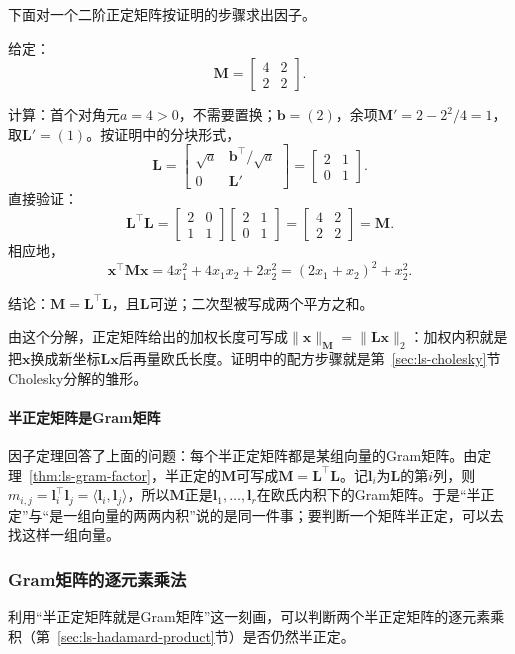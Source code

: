下面对一个二阶正定矩阵按证明的步骤求出因子。
\begin{example}[二阶正定矩阵的配方因子]
\label{ex:ls-gram-factor-two-by-two}
给定：
\[
 \bm M=\begin{bmatrix}4&2\\2&2\end{bmatrix}.
\]

计算：首个对角元$a=4>0$，不需要置换；$\bm b=(2)$，余项$\bm M'=2-2^2/4=1$，取$\bm L'=(1)$。按证明中的分块形式，
\[
 \bm L=\begin{bmatrix}\sqrt a&\bm b^\top/\sqrt a\\ 0&\bm L'\end{bmatrix}=\begin{bmatrix}2&1\\0&1\end{bmatrix}.
\]
直接验证：
\[
 \bm L^\top\bm L=\begin{bmatrix}2&0\\1&1\end{bmatrix}\begin{bmatrix}2&1\\0&1\end{bmatrix}=\begin{bmatrix}4&2\\2&2\end{bmatrix}=\bm M.
\]
相应地，
\[
 \bm x^\top\bm M\bm x=4x_1^2+4x_1x_2+2x_2^2=(2x_1+x_2)^2+x_2^2 .
\]

结论：$\bm M=\bm L^\top\bm L$，且$\bm L$可逆；二次型被写成两个平方之和。
\end{example}
由这个分解，正定矩阵给出的加权长度可写成$\lVert\bm x\rVert_{\bm M}=\lVert\bm L\bm x\rVert_2$：加权内积就是把$\bm x$换成新坐标$\bm L\bm x$后再量欧氏长度。证明中的配方步骤就是第~\ref{sec:ls-cholesky}节Cholesky分解的雏形。

\paragraph{半正定矩阵是Gram矩阵}
因子定理回答了上面的问题：每个半正定矩阵都是某组向量的Gram矩阵。由定理~\ref{thm:ls-gram-factor}，半正定的$\bm M$可写成$\bm M=\bm L^\top\bm L$。记$\bm l_i$为$\bm L$的第$i$列，则$m_{i,j}=\bm l_i^\top\bm l_j=\langle\bm l_i,\bm l_j\rangle$，所以$\bm M$正是$\bm l_1,\ldots,\bm l_r$在欧氏内积下的Gram矩阵。于是“半正定”与“是一组向量的两两内积”说的是同一件事；要判断一个矩阵半正定，可以去找这样一组向量。

\subsubsection{Gram矩阵的逐元素乘法}
\label{sec:ls-schur-product}
利用“半正定矩阵就是Gram矩阵”这一刻画，可以判断两个半正定矩阵的逐元素乘积（第~\ref{sec:ls-hadamard-product}节）是否仍然半正定。

